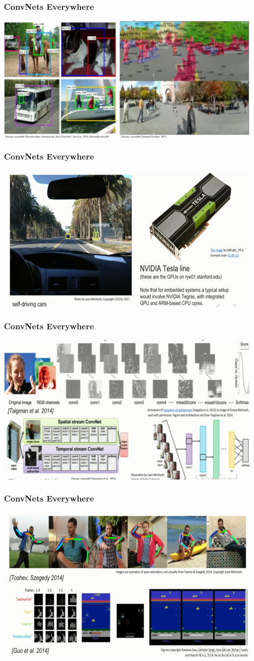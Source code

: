 \documentclass{beamer}
\begin{document}
\begin{frame}
\frametitle{ConvNets Everywhere}
\centering
\includegraphics[width=0.9\linewidth]{Pics/ex1.PNG}
\end{frame}
\begin{frame}
\frametitle{ConvNets Everywhere}
\centering
\includegraphics[width=0.9\linewidth]{Pics/ex2.PNG}
\end{frame}
\begin{frame}
\frametitle{ConvNets Everywhere}
\centering
\includegraphics[width=0.9\linewidth]{Pics/ex3.PNG}
\end{frame}
\begin{frame}
\frametitle{ConvNets Everywhere}
\centering
\includegraphics[width=0.9\linewidth]{Pics/ex4.PNG}
\end{frame}
\end{document}

